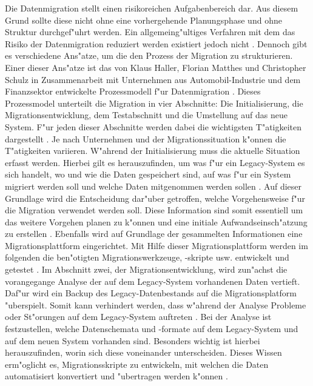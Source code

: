 Die Datenmigration stellt einen risikoreichen Aufgabenbereich dar. Aus diesem Grund sollte diese nicht ohne eine vorhergehende Planungsphase und ohne Struktur durchgef"uhrt werden. Ein allgemeing"ultiges Verfahren mit dem das Risiko der Datenmigration reduziert werden existiert jedoch nicht \citep[S.~3]{wuLawless-1997}. Dennoch gibt es verschiedene Ans"atze, um die den Prozess der Migration zu strukturieren. Einer dieser Ans"atze ist das von Klaus Haller, Florian Matthes und Christopher Schulz in Zusammenarbeit mit Unternehmen aus Automobil-Industrie und dem Finanzsektor entwickelte Prozessmodell f"ur Datenmigration \citep[S.~2f.]{klausMatthesSchulz-2012}. 
\lb
Dieses Prozessmodel unterteilt die Migration in vier Abschnitte: Die Initialisierung, die Migrationsentwicklung, dem Testabschnitt und die Umstellung auf das neue System. F"ur jeden dieser Abschnitte werden dabei die wichtigsten T"atigkeiten dargestellt \citep[S.~5f]{klausMatthesSchulz-2012}. Je nach Unternehmen und der Migrationssituation k"onnen die T"atigkeiten variieren.
\lb
W"ahrend der Initialisierung muss die aktuelle Situation erfasst werden. Hierbei gilt es herauszufinden, um was f"ur ein Legacy-System es sich handelt, wo und wie die Daten gespeichert sind, auf was f"ur ein System migriert werden soll und welche Daten mitgenommen werden sollen \citep[S.~7]{klausMatthesSchulz-2012}. Auf dieser Grundlage wird die Entscheidung dar"uber getroffen, welche Vorgehensweise f"ur die Migration verwendet werden soll. Diese Information sind somit essentiell um das weitere Vorgehen planen zu k"onnen und eine initiale Aufwandseinsch"atzung zu erstellen \citep[S.~7]{klausMatthesSchulz-2012}. Ebenfalls wird auf Grundlage der gesammelten Informationen eine Migrationsplattform eingerichtet. Mit Hilfe dieser Migrationsplattform werden im folgenden die ben"otigten Migrationswerkzeuge, -skripte usw. entwickelt und getestet \citep[S.~7]{klausMatthesSchulz-2012}.
\lb
Im Abschnitt zwei, der Migrationsentwicklung, wird zun"achst die vorangegange Analyse der auf dem Legacy-System vorhandenen Daten vertieft. Daf"ur wird ein Backup des Legacy-Datenbestands auf die Migrationsplatform "uberspielt. Somit kann verhindert werden, dass w"ahrend der Analyse Probleme oder St"orungen auf dem Legacy-System auftreten \citep[S.~7]{klausMatthesSchulz-2012}. Bei der Analyse ist festzustellen, welche Datenschemata und -formate auf dem Legacy-System und auf dem neuen System vorhanden sind. Besonders wichtig ist hierbei herauszufinden, worin sich diese voneinander unterscheiden. Dieses Wissen erm"oglicht es, Migrationsskripte zu entwickeln, mit welchen die Daten automatisiert konvertiert und "ubertragen werden k"onnen \citep[S.~7f.]{klausMatthesSchulz-2012}. 
